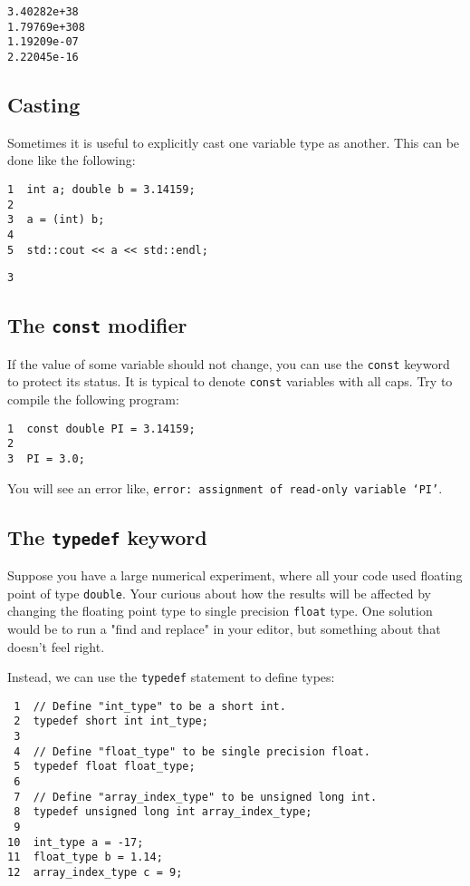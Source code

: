 \documentclass[11pt]{article}
\begin{document}
\begin{verbatim}
3.40282e+38
1.79769e+308
1.19209e-07
2.22045e-16
\end{verbatim}

\subsection{Casting}
\label{sec:orgheadline14}

Sometimes it is useful to explicitly cast one variable type as another. 
This can be done like the following:

\begin{verbatim}
1  int a; double b = 3.14159;
2  
3  a = (int) b;
4  
5  std::cout << a << std::endl;
\end{verbatim}

\begin{verbatim}
3
\end{verbatim}

\subsection{The \texttt{const} modifier}
\label{sec:orgheadline15}

If the value of some variable should not change, you can use the \texttt{const}
keyword to protect its status. It is typical to denote \texttt{const} variables 
with all caps. Try to compile the following program:

\begin{verbatim}
1  const double PI = 3.14159;
2  
3  PI = 3.0;
\end{verbatim}

You will see an error like, \texttt{error: assignment of read-only variable ‘PI’}. 

\subsection{The \texttt{typedef} keyword}
\label{sec:orgheadline16}
Suppose you have a large numerical experiment, where all your code used 
floating point of type \texttt{double}. Your curious about how the results will 
be affected by changing the floating point type to single precision \texttt{float}
type. One solution would be to run a "find and replace" in your editor, but 
something about that doesn't feel right.

Instead, we can use the \texttt{typedef} statement to define types:

\begin{verbatim}
 1  // Define "int_type" to be a short int.
 2  typedef short int int_type;
 3  
 4  // Define "float_type" to be single precision float.
 5  typedef float float_type;
 6  
 7  // Define "array_index_type" to be unsigned long int.
 8  typedef unsigned long int array_index_type;
 9  
10  int_type a = -17; 
11  float_type b = 1.14; 
12  array_index_type c = 9;
\end{verbatim}
\end{document}
